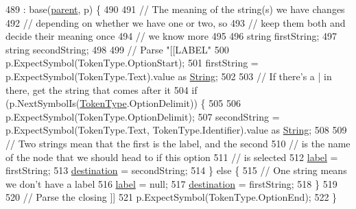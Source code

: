 \begin{DoxyCode}
489                                                                  : base(\hyperlink{a00148_af313a82103fcc2ff5a177dbb06b92f7b}{parent}, p) \{
490 
491                 \textcolor{comment}{// The meaning of the string(s) we have changes}
492                 \textcolor{comment}{// depending on whether we have one or two, so}
493                 \textcolor{comment}{// keep them both and decide their meaning once}
494                 \textcolor{comment}{// we know more}
495 
496                 \textcolor{keywordtype}{string} firstString;
497                 \textcolor{keywordtype}{string} secondString;
498 
499                 \textcolor{comment}{// Parse "[[LABEL"}
500                 p.ExpectSymbol(TokenType.OptionStart);
501                 firstString = p.ExpectSymbol(TokenType.Text).value as \hyperlink{a00051_a301aa7c866593a5b625a8fc158bbeacea27118326006d3829667a400ad23d5d98}{String};
502 
503                 \textcolor{comment}{// If there's a | in there, get the string that comes after it}
504                 \textcolor{keywordflow}{if} (p.NextSymbolIs(\hyperlink{a00051_a301aa7c866593a5b625a8fc158bbeace}{TokenType}.OptionDelimit)) \{
505 
506                     p.ExpectSymbol(TokenType.OptionDelimit);
507                     secondString = p.ExpectSymbol(TokenType.Text, TokenType.Identifier).value as 
      \hyperlink{a00051_a301aa7c866593a5b625a8fc158bbeacea27118326006d3829667a400ad23d5d98}{String};
508 
509                     \textcolor{comment}{// Two strings mean that the first is the label, and the second}
510                     \textcolor{comment}{// is the name of the node that we should head to if this option}
511                     \textcolor{comment}{// is selected}
512                     \hyperlink{a00146_a7f27d78e67fed6992767e995e70fc468}{label} = firstString;
513                     \hyperlink{a00146_abbe56fba06169901508e6c659f06c236}{destination} = secondString;
514                 \} \textcolor{keywordflow}{else} \{
515                     \textcolor{comment}{// One string means we don't have a label}
516                     \hyperlink{a00146_a7f27d78e67fed6992767e995e70fc468}{label} = null;
517                     \hyperlink{a00146_abbe56fba06169901508e6c659f06c236}{destination} = firstString;
518                 \}
519 
520                 \textcolor{comment}{// Parse the closing ]]}
521                 p.ExpectSymbol(TokenType.OptionEnd);
522             \}
\end{DoxyCode}


